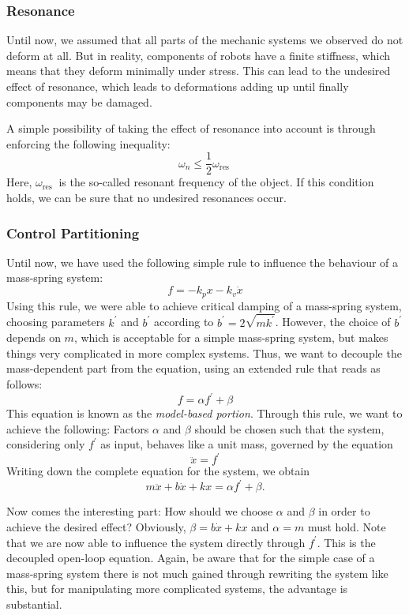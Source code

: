 \subsubsection{Resonance}

Until now, we assumed that all parts of the mechanic systems we observed do not deform at all. But in reality, components of robots have a finite stiffness, which means that they deform minimally under stress. This can lead to the undesired effect of resonance, which leads to deformations adding up until finally components may be damaged.

A simple possibility of taking the effect of resonance into account is through enforcing the following inequality:
$$
\omega_{n} \leq \frac{1}{2} \omega_{\text {res }}
$$
Here, $\omega_{\text {res }}$ is the so-called resonant frequency of the object. If this condition holds, we can be sure that no undesired resonances occur.

\subsubsection{Control Partitioning}

Until now, we have used the following simple rule to influence the behaviour of a mass-spring system:
$$
f=-k_{p} x-k_{v} \dot{x}
$$
Using this rule, we were able to achieve critical damping of a mass-spring system, choosing parameters $k^{\prime}$ and $b^{\prime}$ according to $b^{\prime}=2 \sqrt{m k^{\prime}}$. However, the choice of $b^{\prime}$ depends on $m$, which is acceptable for a simple mass-spring system, but makes things very complicated in more complex systems. Thus, we want to decouple the mass-dependent part from the equation, using an extended rule that reads as follows:
$$
f=\alpha f^{\prime}+\beta
$$
This equation is known as the \textit{model-based portion}. Through this rule, we want to achieve the following: Factors $\alpha$ and $\beta$ should be chosen such that the system, considering only $f^{\prime}$ as input, behaves like a unit mass, governed by the equation
$$
\ddot{x}=f^{\prime}
$$
Writing down the complete equation for the system, we obtain
$$
m \ddot{x}+b \dot{x}+k x=\alpha f^{\prime}+\beta .
$$

Now comes the interesting part: How should we choose $\alpha$ and $\beta$ in order to achieve the desired effect? Obviously, $\beta=b \dot{x}+k x$ and $\alpha=m$ must hold. Note that we are now able to influence the system directly through $f^{\prime}$. This is the decoupled open-loop equation. Again, be aware that for the simple case of a mass-spring system there is not much gained through rewriting the system like this, but for manipulating more complicated systems, the advantage is substantial.


